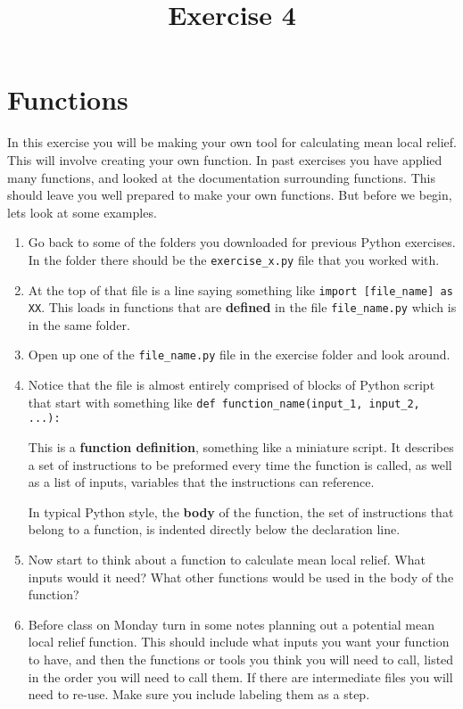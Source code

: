 \documentclass{article}
\begin{document}
\title{Exercise 4}
\maketitle

\section{Functions}
In this exercise you will be making your own tool for calculating mean local relief.  This will involve creating your own function.  In past exercises you have applied many functions, and looked at the documentation surrounding functions.  This should leave you well prepared to make your own functions.  But before we begin, lets look at some examples.
\begin{enumerate}
    \item Go back to some of the folders you downloaded for previous Python exercises.  In the folder there should be the \verb+exercise_x.py+ file that you worked with.  
    \item At the top of that file is a line saying something like \verb+import [file_name] as XX+.  This loads in functions that are \textbf{defined} in the file \verb+file_name.py+ which is in the same folder.
    \item Open up one of the \verb+file_name.py+ file in the exercise folder and look around.
    \item Notice that the file is almost entirely comprised of blocks of Python script that start with something like \verb+def function_name(input_1, input_2, ...):+

        This is a \textbf{function definition}, something like a miniature script.  It describes a set of instructions to be preformed every time the function is called, as well as a list of inputs, variables that the instructions can reference.

        In typical Python style, the \textbf{body} of the function, the set of instructions that belong to a function, is indented directly below the declaration line.
    \item Now start to think about a function to calculate mean local relief.  What inputs would it need?  What other functions would be used in the body of the function?
    \item Before class on Monday turn in some notes planning out a potential mean local relief function.  This should include what inputs you want your function to have, and then the functions or tools you think you will need to call, listed in the order you will need to call them.  If there are intermediate files you will need to re-use.  Make sure you include labeling them as a step.
\end{enumerate}
\end{document}
